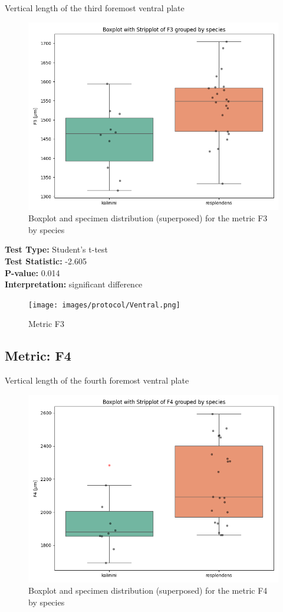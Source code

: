 Vertical length of the third foremost ventral plate

\begin{figure}[H]
\centering
\includegraphics[width=0.7\linewidth]{images/boxplot/boxplot_F3.png}
\caption{  Boxplot and specimen distribution (superposed) for the metric  F3 by species}
\end{figure}

\noindent\textbf{Test Type:} Student's t-test \\
\noindent\textbf{Test Statistic:} -2.605 \\
\noindent\textbf{P-value:} 0.014 \\
\noindent\textbf{Interpretation:} significant difference

\begin{figure}[H]
\centering
\texttt{[image: images/protocol/Ventral.png]}
\caption{ Metric F3}
\end{figure}

\newpage
\subsection*{Metric: F4}

Vertical length of the fourth foremost ventral plate 

\begin{figure}[H]
\centering
\includegraphics[width=0.7\linewidth]{images/boxplot/boxplot_F4.png}
\caption{  Boxplot and specimen distribution (superposed) for the metric  F4 by species}
\end{figure}

